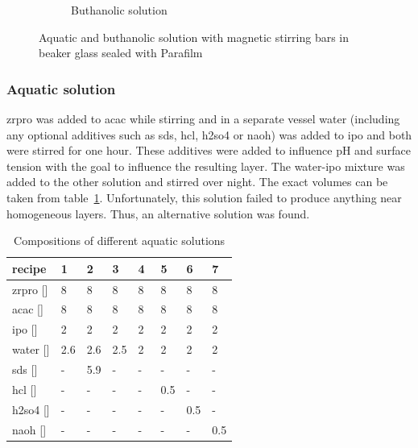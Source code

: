 \begin{figure}[htb]
\begin{subfigure}{0.49\textwidth}
		\label{fig:sol-bu}
		\caption{Buthanolic solution}
	\end{subfigure}
	\label{fig:sol}
	\caption{Aquatic and buthanolic solution with magnetic stirring bars in beaker glass sealed with Parafilm} 
\end{figure}

\subsubsection{Aquatic solution}\label{sec:exp-sol-aq}
\gls{zrpro} was added to \gls{acac} while stirring and in a separate vessel \gls{water} 
(including any optional additives such as \gls{sds}, \gls{hcl}, \gls{h2so4} or \gls{naoh}) 
was added to \gls{ipo} and both were stirred for one hour. 
These additives were added to influence pH and surface tension with the goal to influence the resulting layer. %
The \gls{water}-\gls{ipo} mixture was added to the other solution and stirred over night. 
The exact volumes can be taken from table~\ref{tab:rec1}.
Unfortunately, this solution failed to produce anything near homogeneous layers. 
Thus, an alternative solution was found.
\begin{table}[h]
	\centering
	\caption{Compositions of different aquatic solutions}
	\label{tab:rec1}
	\begin{tabular}{llllllll}
		\hline
		recipe				&1		&2		&3		&4		&5		&6		&7\\
		\hline
		\gls{zrpro} [\ml{}]	&8		&8		&8		&8		&8		&8		&8\\
		\gls{acac}  [\ml{}]	&8		&8		&8		&8		&8		&8		&8\\
		\gls{ipo}   [\ml{}]	&2		&2		&2		&2		&2		&2		&2\\
		\gls{water} [\ml{}]	&2.6	&2.6	&2.5	&2~		&2		&2		&2\\
		\gls{sds}   [\mg{}]	&-		&5.9	&-		&-		&-		&-		&-\\
		\gls{hcl}   [\ml{}]	&-		&-		&-		&-		&0.5	&-		&-\\
		\gls{h2so4} [\ml{}]	&-		&-		&-		&-		&-		&0.5	&-\\
		\gls{naoh}  [\ml{}] &-		&-		&-		&-		&-		&-		&0.5\\
		\hline
	\end{tabular}
\end{table}
%
